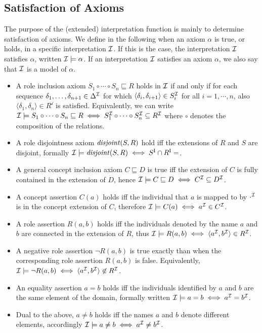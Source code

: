 \begin{example}
\end{example}

\subsection{Satisfaction of Axioms} \label{satisfaction-of-axioms}

The purpose of the (extended) interpretation function is mainly to determine satisfaction of axioms. We define in the following when an axiom $\alpha$ is true, or holds, in a specific interpretation $\mathcal{I}$. If this is the case, the interpretation $\mathcal{I}$ satisfies $\alpha$, written $\mathcal{I} \models \alpha$. If an interpretation $\mathcal{I}$ satisfies an axiom $\alpha$, we also say that $\mathcal{I}$ is a model of $\alpha$.
\begin{itemize}
    \item A role inclusion axiom $S_1 \circ \cdots \circ S_n \sqsubseteq R$ holds in $\mathcal{I}$ if and only if for each sequence $\delta_1, \dots, \delta_{n + 1} \in \Delta^\mathcal{I}$ for which $\langle \delta_i , \delta_{i + 1} \rangle \in S_i^\mathcal{I}$ for all $i = 1, \cdots, n$, also $\langle \delta_1 , \delta_n \rangle \in R^\mathcal{i}$ is satisfied. Equivalently, we can write $\mathcal{I} \models S_1 \circ \cdots \circ S_n \sqsubseteq R \iff S_1^\mathcal{I} \circ \cdots \circ S_n^\mathcal{I} \subseteq R^\mathcal{I}$ where $\circ$ denotes the composition of the relations.
    \item A role disjointness axiom $\mathit{disjoint}(S, R)$ hold iff the extensions of $R$ and $S$ are disjoint, formally $\Imc \models \disjoint(S, R) \iff S^\mathrm{I} \cap R^\mathrm{I} = \empty$.
    \item A general concept inclusion axiom $C \sqsubseteq D$ is true iff the extension of $C$ is fully contained in the extension of $D$, hence $\mathcal{I} \models C \sqsubseteq D \iff C^\mathcal{I} \subseteq D^\mathcal{I}$.
    \item A concept assertion $C(a)$ holds iff the individual that $a$ is mapped to by $\cdot^\mathcal{I}$ is in the concept extension of $C$, therefore $\mathcal{I} \models C (a) \iff a^\mathcal{I} \in C^\mathcal{I}$.
    \item A role assertion $R(a, b)$ holds iff the individuals denoted by the name $a$ and $b$ are connected in the extension of $R$, thus $\mathcal{I} \models R(a, b) \iff \langle a^\mathcal{I}, b^\mathcal{I} \rangle \in R^\mathcal{I}$.
    \item A negative role assertion $\lnot R(a, b)$ is true exactly than when the corresponding role assertion $R(a, b)$ is false. Equivalently, $\mathcal{I} \models \lnot R(a, b) \iff \langle a^\mathcal{I}, b^\mathcal{I} \rangle \not\in R^\mathcal{I}$.
    \item An equality assertion $a = b$ holds iff the individuals identified by $a$ and $b$ are the same element of the domain, formally written $\mathcal{I} \models a = b \iff a^\mathcal{I} = b^\mathcal{I}$.
    \item Dual to the above, $a \not = b$ holds iff the names $a$ and $b$ denote different elements, accordingly $\mathcal{I} \models a \not= b \iff a^\mathcal{I} \not= b^\mathcal{I}$.
\end{itemize}
